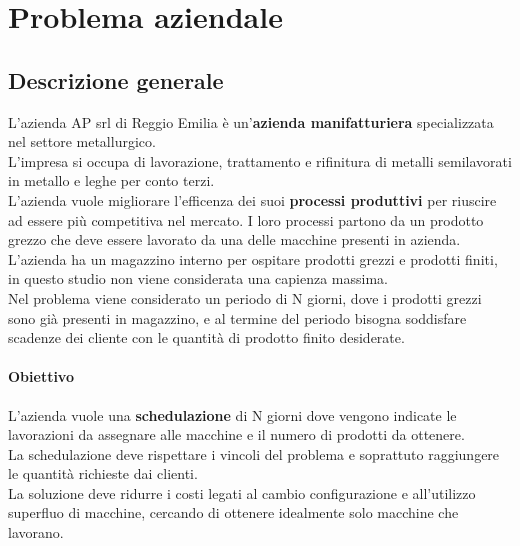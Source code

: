 \section{Problema aziendale}
\subsection{Descrizione generale}
L'azienda AP srl di Reggio Emilia è un'\textbf{azienda manifatturiera} specializzata nel settore metallurgico. \\
L'impresa si occupa di lavorazione, trattamento e rifinitura di metalli semilavorati in metallo e leghe per conto terzi. \\
L'azienda vuole migliorare l'efficenza dei suoi \textbf{processi produttivi} per riuscire ad essere più competitiva nel mercato.
I loro processi partono da un prodotto grezzo che deve essere lavorato da una delle macchine presenti in azienda.\\
L'azienda ha un magazzino interno per ospitare prodotti grezzi e prodotti finiti, in questo studio non viene considerata una capienza massima.\\
Nel problema viene considerato un periodo di N giorni, dove i prodotti grezzi sono già presenti in magazzino, e al termine del periodo bisogna soddisfare scadenze dei cliente con le quantità di prodotto finito desiderate.\\
\paragraph*{Obiettivo} L'azienda vuole una \textbf{schedulazione} di N giorni dove vengono indicate le lavorazioni da assegnare alle macchine e il numero di prodotti da ottenere. \\
La schedulazione deve rispettare i vincoli del problema e soprattuto raggiungere le quantità richieste dai clienti.\\
La soluzione deve ridurre i costi legati al cambio configurazione e all'utilizzo superfluo di macchine, cercando di ottenere idealmente solo macchine che lavorano.
